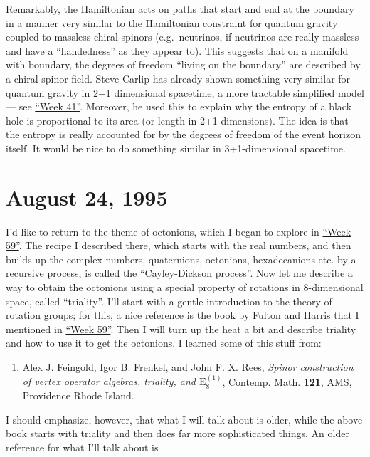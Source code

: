 \documentclass{article}
\def\tightlist{}
\begin{document}
Remarkably, the Hamiltonian acts on paths that start and end at the
boundary in a manner very similar to the Hamiltonian constraint for
quantum gravity coupled to massless chiral spinors (e.g.~neutrinos, if
neutrinos are really massless and have a ``handedness'' as they appear
to). This suggests that on a manifold with boundary, the degrees of
freedom ``living on the boundary'' are described by a chiral spinor
field. Steve Carlip has already shown something very similar for quantum
gravity in 2+1 dimensional spacetime, a more tractable simplified model
--- see \protect\hyperlink{week41}{``Week 41''}. Moreover, he used this
to explain why the entropy of a black hole is proportional to its area
(or length in 2+1 dimensions). The idea is that the entropy is really
accounted for by the degrees of freedom of the event horizon itself. It
would be nice to do something similar in 3+1-dimensional spacetime.
\hypertarget{week61}{%
\section{August 24, 1995}\label{week61}}

I'd like to return to the theme of octonions, which I began to explore
in \protect\hyperlink{week59}{``Week 59''}. The recipe I described
there, which starts with the real numbers, and then builds up the
complex numbers, quaternions, octonions, hexadecanions etc. by a
recursive process, is called the ``Cayley-Dickson process''. Now let me
describe a way to obtain the octonions using a special property of
rotations in 8-dimensional space, called ``triality''. I'll start with a
gentle introduction to the theory of rotation groups; for this, a nice
reference is the book by Fulton and Harris that I mentioned in
\protect\hyperlink{week59}{``Week 59''}. Then I will turn up the heat a
bit and describe triality and how to use it to get the octonions. I
learned some of this stuff from:

\begin{enumerate}
\def\labelenumi{\arabic{enumi})}
\tightlist
\item
  Alex J. Feingold, Igor B. Frenkel, and John F. X. Rees, \emph{Spinor
  construction of vertex operator algebras, triality, and
  \(\mathrm{E}_8^{(1)}\)}, Contemp. Math. \textbf{121}, AMS, Providence
  Rhode Island.
\end{enumerate}

I should emphasize, however, that what I will talk about is older, while
the above book starts with triality and then does far more sophisticated
things. An older reference for what I'll talk about is
\end{document}
